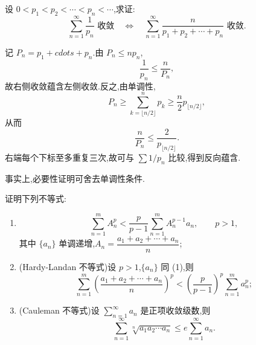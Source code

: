 \begin{example}
    设 $0<p_1<p_2<\cdots<p_n<\cdots$,求证:
    \[
        \displaystyle\sum\limits_{n=1}^{\infty}\dfrac{1}{p_n}\text{ 收敛}
        \quad\Longleftrightarrow\quad
        \sum\limits_{n=1}^{\infty}\dfrac{n}{p_1+p_2+\cdots+p_n}\text{ 收敛}.
    \]
\end{example}
\exampleblank

\begin{solution}
    记 $P_n=p_1+cdots+p_n$.由 $P_n\leq np_n$,
    \[
        \dfrac{1}{p_n}\leq\dfrac{n}{P_n},
    \]
    故右侧收敛蕴含左侧收敛.反之,由单调性,
    \[
        P_n\geq\sum\limits_{k=\lfloor n/2\rfloor}^{n}p_k
        \geq\dfrac{n}{2}p_{\lfloor n/2\rfloor},
    \]
    从而
    \[
        \dfrac{n}{P_n}\leq\dfrac{2}{p_{\lfloor n/2\rfloor}}.
    \]
    右端每个下标至多重复三次,故可与 $\displaystyle \sum1/p_n$ 比较,得到反向蕴含.
\end{solution}

\begin{remark}
    事实上,必要性证明可舍去单调性条件.
\end{remark}

\begin{example}
    证明下列不等式:
    \begin{enumerate}
        \item
              \[
                  \displaystyle\sum\limits_{n=1}^m A_n^p
                  <\dfrac{p}{p-1}\sum\limits_{n=1}^mA_n^{p-1}a_n,
                  \qquad p>1,
              \]
              其中 $\{a_n\}$ 单调递增,$\displaystyle A_n=\dfrac{a_1+a_2+\cdots+a_n}{n}$;
        \item (Hardy-Landan 不等式)设 $p>1$,$\{a_n\}$ 同 (1),则
              \[
                  \displaystyle\sum\limits_{n=1}^m\left(\dfrac{a_1+a_2+\cdots+a_n}{n}\right)^p
                  <\left(\dfrac{p}{p-1}\right)^p\sum\limits_{n=1}^ma_n^p;
              \]
        \item (Cauleman 不等式)设 $\displaystyle\sum\limits_{n=1}^{\infty}a_n$ 是正项收敛级数,则
              \[
                  \displaystyle\sum\limits_{n=1}^{\infty}\sqrt[n]{a_1a_2\cdots a_n}
                  \leq e\sum\limits_{n=1}^{\infty}a_n.
              \]
    \end{enumerate}
\end{example}
\exampleblank

